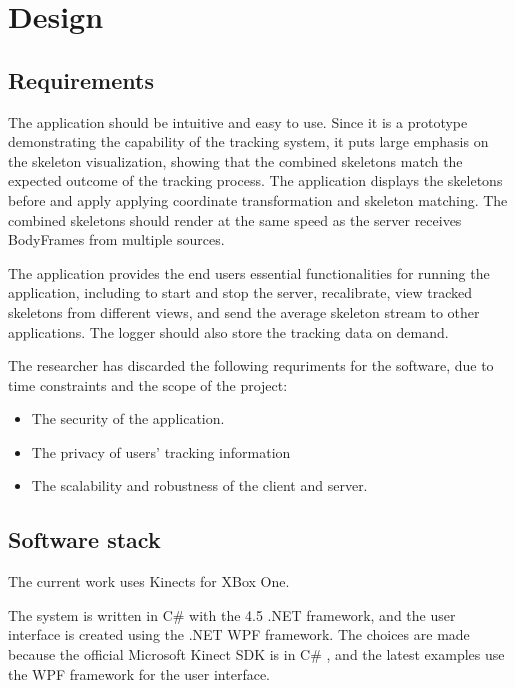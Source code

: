 


\chapter{Design}

\label{chapter:design}

\section{Requirements}
\label{sec:design_requirements}

The application should be intuitive and easy to use. Since it is a prototype demonstrating the capability of the tracking system, it puts large emphasis on the skeleton visualization, showing that the combined skeletons match the expected outcome of the tracking process. The application displays the skeletons before and apply applying coordinate transformation and skeleton matching. The combined skeletons should render at the same speed as the server receives BodyFrames from multiple sources. 

The application provides the end users essential functionalities for running the application, including to start and stop the server, recalibrate, view tracked skeletons from different views, and send the average skeleton stream to other applications. The logger should also store the tracking data on demand.

The researcher has discarded the following requriments for the software, due to time constraints and the scope of the project:

\begin{itemize}
  \item The security of the application.
  \item The privacy of users' tracking information
  \item The scalability and robustness of the client and server.
\end{itemize}

\section{Software stack}
\label{sec:design_software_stack}

The current work uses Kinects for XBox One.

The system is written in C\# with the 4.5 .NET framework, and the user interface is 
created using the .NET WPF framework. The choices are made because the official Microsoft Kinect SDK is in C\# , and the latest examples use the WPF framework for the user interface. 

